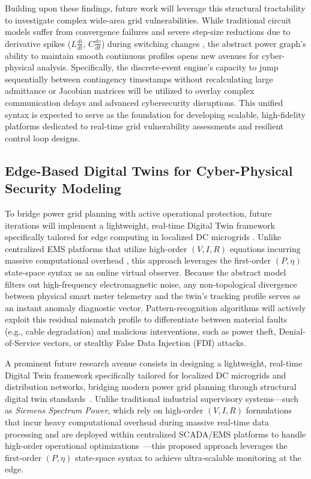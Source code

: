 \documentclass[energies,accept,oneauthor,pdftex]{Definitions/mdpi}
\begin{document}
Building upon these findings, future work will leverage this structural tractability to investigate complex wide-area grid vulnerabilities. While traditional circuit models suffer from convergence failures and severe step-size reductions due to derivative spikes ($L \frac{di}{dt}$, $C \frac{dv}{dt}$) during switching changes \cite{en19020304}, the abstract power graph's ability to maintain smooth continuous profiles opens new avenues for cyber-physical analysis. Specifically, the discrete-event engine's capacity to jump sequentially between contingency timestamps without recalculating large admittance or Jacobian matrices will be utilized to overlay complex communication delays and advanced cybersecurity disruptions. This unified syntax is expected to serve as the foundation for developing scalable, high-fidelity platforms dedicated to real-time grid vulnerability assessments and resilient control loop designs.




\subsection{Edge-Based Digital Twins for Cyber-Physical Security Modeling}\label{sec:future_digital_twins}
To bridge power grid planning with active operational protection, future iterations will implement a lightweight, real-time Digital Twin framework specifically tailored for edge computing in localized DC microgrids \cite{en19020556}. Unlike centralized EMS platforms that utilize high-order $(V, I, R)$ equations incurring massive computational overhead \cite{en18051020}, this approach leverages the first-order $(P, \eta)$ state-space syntax as an online virtual observer. Because the abstract model filters out high-frequency electromagnetic noise, any non-topological divergence between physical smart meter telemetry and the twin's tracking profile serves as an instant anomaly diagnostic vector. Pattern-recognition algorithms will actively exploit this residual mismatch profile to differentiate between material faults (e.g., cable degradation) and malicious interventions, such as power theft, Denial-of-Service vectors, or stealthy False Data Injection (FDI) attacks.


A prominent future research avenue consists in designing a lightweight, real-time Digital Twin framework specifically tailored for localized DC microgrids and distribution networks, bridging modern power grid planning through structural digital twin standards~\cite{en19020556}. Unlike traditional industrial supervisory systems—such as \textit{Siemens Spectrum Power}, which rely on high-order $(V, I, R)$ formulations that incur heavy computational overhead during massive real-time data processing and are deployed within centralized SCADA/EMS platforms to handle high-order operational optimizations~\cite{en18051020}—this proposed approach leverages the first-order $(P, \eta)$ state-space syntax to achieve ultra-scalable monitoring at the edge.
\end{document}

